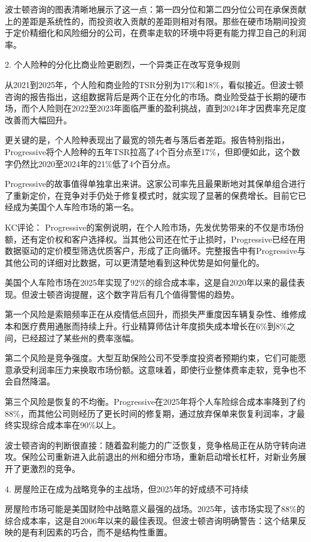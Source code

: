 \documentclass[11pt]{ctexart}
\begin{document}
波士顿咨询的图表清晰地展示了这一点：第一四分位和第二四分位公司在承保贡献上的差距是系统性的，而投资收入贡献的差距则相对有限。那些在硬市场期间投资于定价精细化和风险细分的公司，在费率走软的环境中将更有能力捍卫自己的利润率。

2. 个人险种的分化比商业险更剧烈，一个异类正在改写竞争规则

从2021到2025年，个人险和商业险的TSR分别为17\%和18\%，看似接近。但波士顿咨询的报告指出，这组数据背后是两个正在分化的市场。商业险受益于长期的硬市场，而个人险则在2022至2023年面临严重的盈利挑战，直到2024年才因费率充足度改善而大幅回升。

更关键的是，个人险种表现出了最宽的领先者与落后者差距。报告特别指出，Progressive将个人险种的五年TSR拉高了4个百分点至17\%，但即便如此，这个数字仍然比2020至2024年的21\%低了4个百分点。

Progressive的故事值得单独拿出来讲。这家公司率先且最果断地对其保单组合进行了重新定价，在竞争对手仍处于修复模式时，就实现了显著的保费增长。目前它已经成为美国个人车险市场的第一名。

KC评论： Progressive的案例说明，在个人险市场，先发优势带来的不仅是市场份额，还有定价权和客户选择权。当其他公司还在忙于止损时，Progressive已经在用数据驱动的定价模型筛选优质客户，形成了正向循环。完整报告中有Progressive与其他公司的详细对比数据，可以更清楚地看到这种优势是如何量化的。

美国个人车险市场在2025年实现了92\%的综合成本率，这是自2020年以来的最佳表现。但波士顿咨询提醒，这个数字背后有几个值得警惕的趋势。

第一个风险是索赔频率正在从疫情低点回升，而损失严重度因车辆复杂性、维修成本和医疗费用通胀而持续上升。行业精算师估计年度损失成本增长在6\%到8\%之间，已经超过了某些州的费率涨幅。

第二个风险是竞争强度。大型互助保险公司不受季度投资者预期约束，它们可能愿意承受利润率压力来换取市场份额。这意味着，即使行业整体费率走软，竞争也不会自然降温。

第三个风险是恢复的不均衡。Progressive在2025年将个人车险综合成本率降到了约88\%，而其他公司则经历了更长时间的修复期，通过放弃保单来恢复利润率，才最终实现综合成本率在90\%以上。

波士顿咨询的判断很直接：随着盈利能力的广泛恢复，竞争格局正在从防守转向进攻。保险公司重新进入此前退出的州和细分市场，重新启动增长杠杆，对新业务展开了更激烈的竞争。

4. 房屋险正在成为战略竞争的主战场，但2025年的好成绩不可持续

房屋险市场可能是美国财险中战略意义最强的战场。2025年，该市场实现了88\%的综合成本率，这是自2006年以来的最佳表现。但波士顿咨询明确警告：这个结果反映的是有利因素的巧合，而不是结构性重置。
\end{document}
